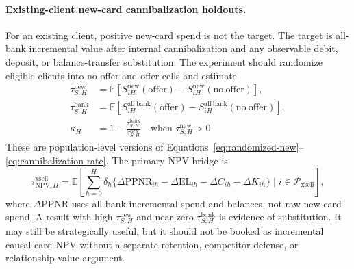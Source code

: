 \documentclass[11pt]{article}
\newcommand{\E}{\mathbb{E}}
\newcommand{\NPV}{\mathrm{NPV}}
\newcommand{\EL}{\mathrm{EL}}
\newcommand{\PPNR}{\mathrm{PPNR}}
\newcommand{\1}{\mathbf{1}}
\begin{document}
\paragraph{Existing-client new-card cannibalization holdouts.}
For an existing client, positive new-card spend is not the target. The target
is all-bank incremental value after internal cannibalization and any
observable debit, deposit, or balance-transfer substitution. The experiment
should randomize eligible clients into no-offer and offer cells and estimate
\begin{align}
  \tau^{\mathrm{new}}_{S,H}
    &=
    \E[S^{\mathrm{new}}_{iH}(\mathrm{offer})
      -S^{\mathrm{new}}_{iH}(\mathrm{no\ offer})], \\
  \tau^{\mathrm{bank}}_{S,H}
    &=
    \E[S^{\mathrm{all\ bank}}_{iH}(\mathrm{offer})
      -S^{\mathrm{all\ bank}}_{iH}(\mathrm{no\ offer})], \\
  \kappa_H
    &=
    1-\frac{\tau^{\mathrm{bank}}_{S,H}}{\tau^{\mathrm{new}}_{S,H}}
    \quad \text{when } \tau^{\mathrm{new}}_{S,H}>0.
    \label{eq:experimental-cannibalization}
\end{align}
These are population-level versions of
Equations~\eqref{eq:randomized-new}--\eqref{eq:cannibalization-rate}. The
primary NPV bridge is
\begin{equation}
  \tau^{\mathrm{xsell}}_{\NPV,H}
  =
  \E\!\left[
    \sum_{h=0}^{H}\delta_h
    \{\Delta \PPNR_{ih}-\Delta \EL_{ih}-\Delta C_{ih}
      -\Delta K_{ih}\}
    \mid i\in\mathcal{P}_{\mathrm{xsell}}
  \right],
  \label{eq:xsell-npv-estimand}
\end{equation}
where $\Delta \PPNR$ uses all-bank incremental spend and balances, not raw
new-card spend. A result with high $\tau^{\mathrm{new}}_{S,H}$ and near-zero
$\tau^{\mathrm{bank}}_{S,H}$ is evidence of substitution. It may still be
strategically useful, but it should not be booked as incremental causal card
NPV without a separate retention, competitor-defense, or relationship-value
argument.
\end{document}
